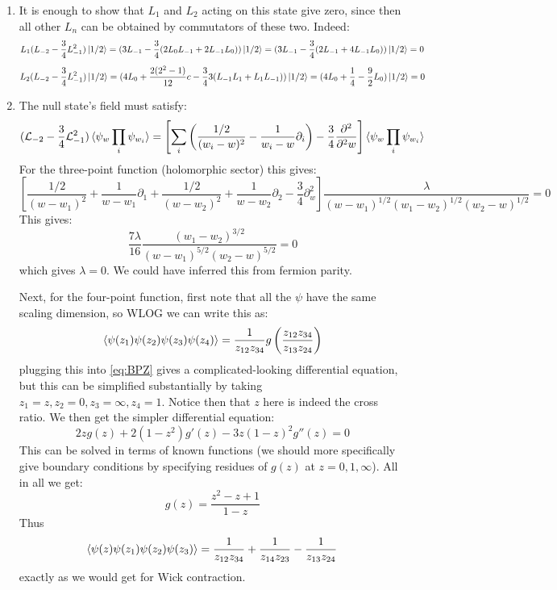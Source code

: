 \documentclass[11pt]{article}
\begin{document}
\begin{enumerate}
	\item It is enough to show that $L_1$ and $L_2$ acting on this state give zero, since then all other $L_n$ can be obtained by commutators of these two. Indeed:
	\[
		L_1 (L_{-2} - \frac34 L_{-1}^2) \ket{1/2} = (3 L_{-1} -\frac34 (2 L_0 L_{-1} + 2 L_{-1} L_0 ) ) \ket{1/2} = (3 L_{-1} - \frac34 ( 2 L_{-1} + 4 L_{-1} L_0) ) \ket{1/2}  = 0
	\]
	\[
		L_2 (L_{-2} - \frac34 L_{-1}^2) \ket{1/2} = (4 L_0 + \frac{2 (2^2 - 1)}{12} c - \frac34 3 (L_{-1} L_1 + L_1 L_{-1})) \ket{1/2} = (4 L_0 + \frac14 - \frac92 L_0 ) \ket{1/2} = 0
	\]
	\item The null state's field must satisfy:
	\begin{equation}\label{eq:BPZ}
				(\mathcal L_{-2} - \frac34 \mathcal L_{-1}^2) \braket{\psi_{w} \prod_{i} \psi_{w_i}} = \left[\sum_{i} \left(\frac{1/2}{(w_i - w)^2} - \frac{1}{w_i - w} \partial_i\right) - \frac34 \frac{\partial^2}{\partial^2 w}\right] \braket{\psi_{w} \prod_{i} \psi_{w_i}}
	\end{equation}
	For the three-point function (holomorphic sector) this gives:
	\[
		\left[ \frac{1/2}{(w-w_1)^2} + \frac{1}{w-w_1} \partial_1 + \frac{1/2}{(w-w_2)^2} + \frac{1}{w-w_2} \partial_2 - \frac34 \partial^2_w \right] \frac{\lambda}{(w - w_1)^{1/2} (w_1 - w_2)^{1/2} (w_2 - w)^{1/2}} = 0
	\]
	This gives:
	\[
		\frac{7 \lambda}{16} \frac{(w_1 - w_2)^{3/2}}{(w-w_1)^{5/2} (w_2 - w)^{5/2}} = 0
	\]
	which gives $\lambda = 0$. We could have inferred this from fermion parity. 
	
	Next, for the four-point function, first note that all the $\psi$ have the same scaling dimension, so WLOG we can write this as:
	\[
		\braket{\psi(z_1) \psi(z_2) \psi(z_3) \psi(z_4)} = \frac{1}{z_{12} z_{34}}  g\left(\frac{z_{12} z_{34}}{z_{13} z_{24}}\right)
	\]
	plugging this into \eqref{eq:BPZ} gives a complicated-looking differential equation, but this can be simplified substantially by taking $z_1 = z, z_2 = 0, z_3 = \infty, z_4 = 1$. Notice then that $z$ here is indeed the cross ratio. We then get the simpler differential equation:
	\[
		2 z g(z) + 2 (1-z^2) g'(z) - 3 z (1-z)^2 g''(z) = 0
	\]
	This can be solved in terms of known functions (we should more specifically give boundary conditions by specifying residues of $g(z)$ at $z = 0, 1, \infty$). All in all we get:
	\[
		g(z) = \frac{z^2 - z + 1}{1- z}
	\]
	Thus 
	\[
		\braket{\psi(z) \psi(z_1) \psi(z_2) \psi(z_3)} = \frac{1}{z_{12} z_{34}} + \frac{1}{z_{14} z_{23}} - \frac{1}{z_{13} z_{24}}
	\]
	exactly as we would get for Wick contraction. 
	

\end{enumerate}
\end{document}
